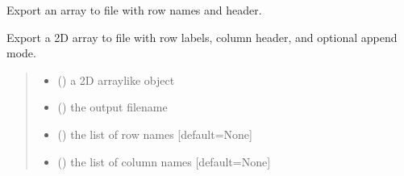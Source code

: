 \documentclass[letterpaper,12pt,english]{sphinxmanual}
\begin{document}
\begin{fulllineitems}
\label{\detokenize{api/core:cbmpy.CBTools.exportLabelledArrayWithHeader}}
\pysigstartsignatures
\pysiglinewithargsret
{}
{\sphinxparamcomma {}\sphinxparamcomma {}\sphinxparamcomma {}\sphinxparamcomma {}\sphinxparamcomma {}}
{}
\pysigstopsignatures
\sphinxAtStartPar
Export an array to file with row names and header.

\sphinxAtStartPar
Export a 2D array to file with row labels, column header, and optional
append mode.
\begin{quote}\begin{description}
\begin{itemize}
\item {} 
\sphinxAtStartPar
{} () \textendash{} a 2D array\sphinxhyphen{}like object

\item {} 
\sphinxAtStartPar
{} () \textendash{} the output filename

\item {} 
\sphinxAtStartPar
{} (\sphinxstyleliteralemphasis{\sphinxupquote{, }}) \textendash{} the list of row names {[}default=None{]}

\item {} 
\sphinxAtStartPar
{} (\sphinxstyleliteralemphasis{\sphinxupquote{, }}) \textendash{} the list of column names {[}default=None{]}


\end{itemize}
\end{description}
\end{quote}
\end{fulllineitems}
\end{document}
